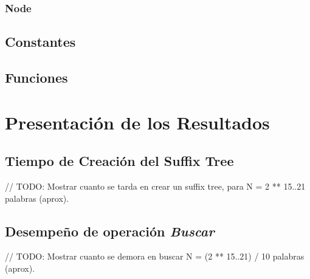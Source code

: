 \documentclass[letterpaper,10pt]{article}
\begin{document}
	\subsubsection{Node}

	\subsection{Constantes}

	\subsection{Funciones}

	\newpage

	\section{Presentación de los Resultados}

	\subsection{Tiempo de Creación del Suffix Tree}

	// TODO: Mostrar cuanto se tarda en crear un suffix tree, para N = 2 ** 15..21 palabras (aprox).

	\newpage

	\subsection{Desempeño de operación \textit{Buscar}}

	// TODO: Mostrar cuanto se demora en buscar N = (2 ** 15..21) / 10 palabras (aprox).

	\newpage
\end{document}
